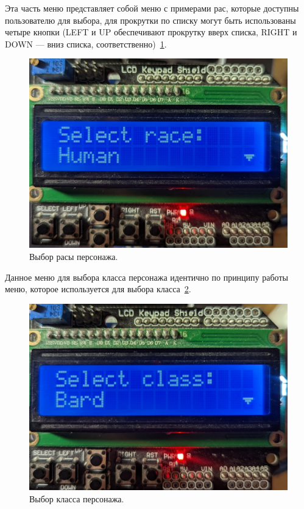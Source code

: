 Эта часть меню представляет собой меню с примерами рас, которые доступны пользователю для выбора, для прокрутки по списку могут быть использованы четыре кнопки (LEFT и UP обеспечивают прокрутку вверх списка, RIGHT и DOWN --- вниз списка, соответственно)~\ref{fig:race}.

\begin{figure}[H]
    \centering
    \includegraphics[scale=0.15]{selectRace.jpg}
    \caption{Выбор расы персонажа.}
    \label{fig:race}
\end{figure}

Данное меню для выбора класса персонажа идентично по принципу работы меню, которое используется для выбора класса~\ref{fig:class}. 

\begin{figure}[H]
    \centering
    \includegraphics[scale=0.15]{selectClass.jpg}
    \caption{Выбор класса персонажа.}
    \label{fig:class}
\end{figure}


